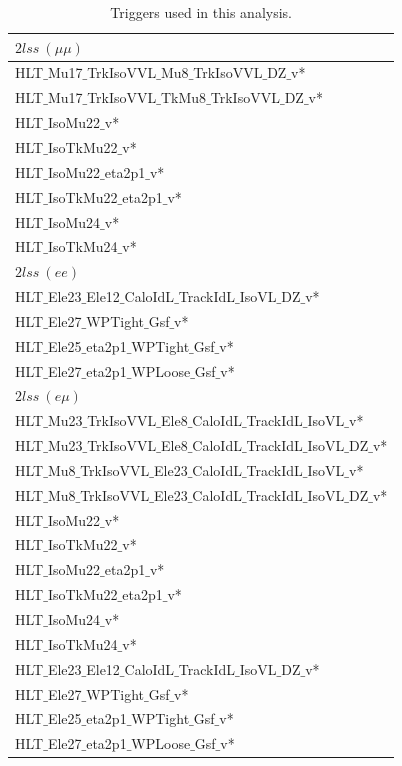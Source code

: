 \begin{longtable}{l}
\caption[Trigger list]{Triggers used in this analysis.\label{tab:triggers}}\\
\hline
$2lss~(\mu\mu)$ \\
\hline
HLT$\_$Mu17$\_$TrkIsoVVL$\_$Mu8$\_$TrkIsoVVL$\_$DZ$\_$v* \\
HLT$\_$Mu17$\_$TrkIsoVVL$\_$TkMu8$\_$TrkIsoVVL$\_$DZ$\_$v* \\
HLT$\_$IsoMu22$\_$v* \\
HLT$\_$IsoTkMu22$\_$v* \\
HLT$\_$IsoMu22$\_$eta2p1$\_$v* \\
HLT$\_$IsoTkMu22$\_$eta2p1$\_$v* \\
HLT$\_$IsoMu24$\_$v* \\
HLT$\_$IsoTkMu24$\_$v* \\
\hline
\hline
$2lss~(ee)$ \\
\hline
HLT$\_$Ele23$\_$Ele12$\_$CaloIdL$\_$TrackIdL$\_$IsoVL$\_$DZ$\_$v* \\
HLT$\_$Ele27$\_$WPTight$\_$Gsf$\_$v* \\
HLT$\_$Ele25$\_$eta2p1$\_$WPTight$\_$Gsf$\_$v* \\
HLT$\_$Ele27$\_$eta2p1$\_$WPLoose$\_$Gsf$\_$v* \\
\hline
\hline
$2lss~(e\mu)$ \\
\hline
HLT$\_$Mu23$\_$TrkIsoVVL$\_$Ele8$\_$CaloIdL$\_$TrackIdL$\_$IsoVL$\_$v* \\
HLT$\_$Mu23$\_$TrkIsoVVL$\_$Ele8$\_$CaloIdL$\_$TrackIdL$\_$IsoVL$\_$DZ$\_$v* \\
HLT$\_$Mu8$\_$TrkIsoVVL$\_$Ele23$\_$CaloIdL$\_$TrackIdL$\_$IsoVL$\_$v* \\
HLT$\_$Mu8$\_$TrkIsoVVL$\_$Ele23$\_$CaloIdL$\_$TrackIdL$\_$IsoVL$\_$DZ$\_$v* \\
HLT$\_$IsoMu22$\_$v* \\
HLT$\_$IsoTkMu22$\_$v* \\
HLT$\_$IsoMu22$\_$eta2p1$\_$v* \\
HLT$\_$IsoTkMu22$\_$eta2p1$\_$v* \\
HLT$\_$IsoMu24$\_$v* \\
HLT$\_$IsoTkMu24$\_$v* \\
HLT$\_$Ele23$\_$Ele12$\_$CaloIdL$\_$TrackIdL$\_$IsoVL$\_$DZ$\_$v* \\
HLT$\_$Ele27$\_$WPTight$\_$Gsf$\_$v* \\
HLT$\_$Ele25$\_$eta2p1$\_$WPTight$\_$Gsf$\_$v* \\
HLT$\_$Ele27$\_$eta2p1$\_$WPLoose$\_$Gsf$\_$v* \\
\hline
\end{longtable}


